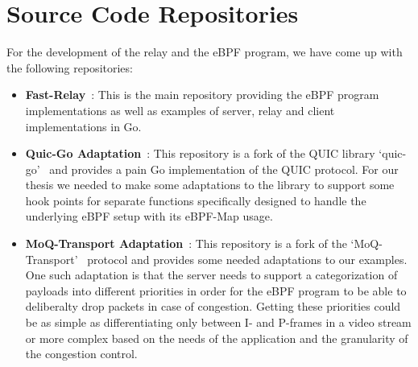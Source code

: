 \section{Source Code Repositories}\label{sec:source_code_repos}
For the development of the relay and the eBPF program, we have come up with the following repositories:
\begin{itemize}
    
    \item \textbf{Fast-Relay}~\parencite{adaptive-moq-repo}:
    This is the main repository providing the eBPF program implementations as well as examples of 
    server, relay and client implementations in Go.
    
    \item \textbf{Quic-Go Adaptation}~\parencite{quic-go-prio-packs-repo}:
    This repository is a fork of the QUIC library `quic-go'~\parencite{quic-go-repo} and provides a 
    pain Go implementation of the QUIC protocol.
    For our thesis we needed to make some adaptations to the library to support some hook points for 
    separate functions specifically designed to handle the underlying eBPF setup with its eBPF-Map usage. 
    
    \item \textbf{MoQ-Transport Adaptation}~\parencite{priority-moqtransport-repo}:
    This repository is a fork of the `MoQ-Transport'~\parencite{draft-moqtransport} protocol and provides
    some needed adaptations to our examples. One such adaptation is that the server needs to support a 
    categorization of payloads into different priorities in order for the eBPF program to be able to 
    deliberalty drop packets in case of congestion.
    Getting these priorities could be as simple as differentiating only between I- and P-frames in a video 
    stream or more complex based on the needs of the application and the granularity of the congestion control.
    
\end{itemize}
